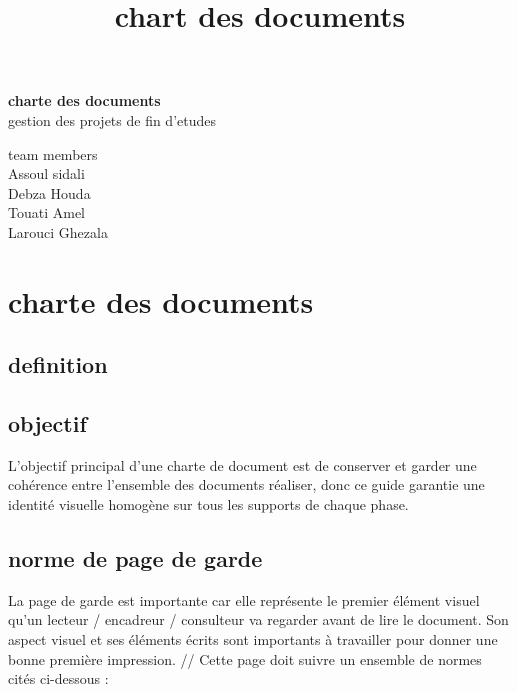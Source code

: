 \documentclass[11pt,fleqn]{book} %
\begin{document}
\title{chart des documents}
\begingroup
\thispagestyle{empty}
\centering
\vspace*{5cm}
\par\normalfont\fontsize{35}{35}\sffamily\selectfont
\textbf{charte des documents}\\
{\LARGE gestion des projets de fin d'etudes}\par %
\vspace*{2cm}
\raggedright
{\Huge team members \\}
\vspace*{0.5cm}
{\huge 
Assoul sidali \\
Debza Houda\\
Touati Amel\\
Larouci Ghezala\\}\par %
\endgroup


\pagestyle{empty} %

\tableofcontents %


\pagestyle{fancy} %
\chapter{charte des documents}
\section{definition}
\section{objectif}
L'objectif principal d'une charte de document est de conserver et garder une cohérence 
entre l’ensemble des documents réaliser, donc ce guide garantie une identité visuelle 
homogène sur tous les supports de chaque phase.
\section{norme de page de garde}
La page de garde est importante car elle représente le premier élément visuel qu'un
lecteur / encadreur / consulteur va regarder avant de lire le document. Son aspect
visuel et ses éléments écrits sont importants à travailler pour donner une bonne
première impression. //
Cette page doit suivre un ensemble de normes cités ci-dessous :
\end{document}
